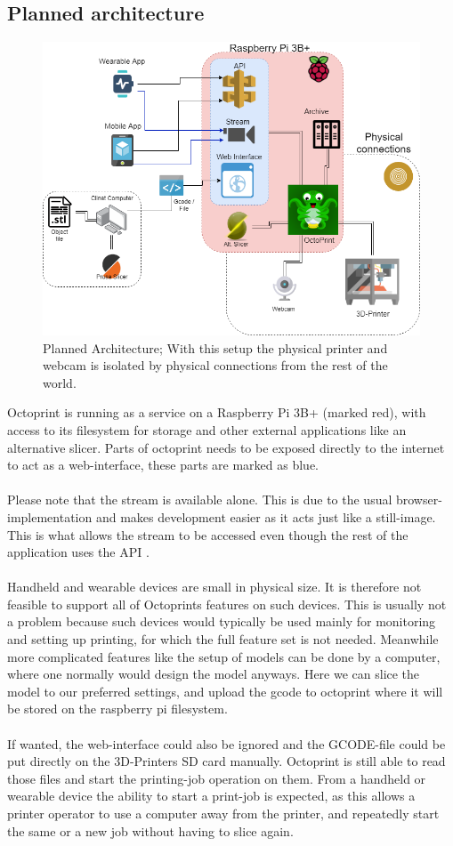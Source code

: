 \documentclass[a4paper, 12pt]{article}
\newcommand{\mysubsection}[1]{\subsection*{#1} \addcontentsline{toc}{subsection}{#1}}
\begin{document}
    \mysubsection{Planned architecture}
    \begin{figure}[h!]
        \includegraphics[scale=0.5]{figures/TizenPrint-architecture.png}
        \caption{Planned Architecture;
        With this setup the physical printer and webcam is isolated by physical
        connections from the rest of the world.}
    \end{figure}

    Octoprint is running as a service on a Raspberry Pi 3B+ (marked red), with access to its filesystem for storage and other
    external applications like an alternative slicer.
    Parts of octoprint needs to be exposed directly to the internet to act as a web-interface, these parts are marked as
    blue.
    \\\\
    Please note that the stream is available alone.
    This is due to the usual browser-implementation and makes development easier as it acts just like a still-image.
    This is what allows the stream to be accessed even though the rest of the application uses the API .
    \\\\
    Handheld and wearable devices are small in physical size.
    It is therefore not feasible to support all of Octoprints features on such devices.
    This is usually not a problem because such devices would typically be used mainly for monitoring and setting up printing,
    for which the full feature set is not needed.
    Meanwhile more complicated features like the setup of models can be done by a computer, where one normally would design
    the model anyways.
    Here we can slice the model to our preferred settings, and upload the gcode to octoprint where it will be stored on
    the raspberry pi filesystem.
    \\\\
    If wanted, the web-interface could also be ignored and the GCODE-file could be put directly on the 3D-Printers SD card
    manually.
    Octoprint is still able to read those files and start the printing-job operation on them.
    From a handheld or wearable device the ability to start a print-job is expected, as this allows a printer operator
    to use a computer away from the printer, and repeatedly start the same or a new job without having to slice again.
\end{document}

